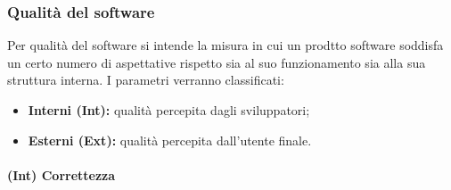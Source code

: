\begin{table}[!htpb]
\end{table}
\subsubsection{Qualità del software}
Per qualità del software si intende la misura in cui un prodtto software soddisfa un certo numero di aspettative rispetto sia al suo funzionamento sia alla sua struttura interna. I parametri verranno classificati:
\begin{itemize}
	\item{\textbf{Interni (Int):} qualità percepita dagli sviluppatori;}
	\item{\textbf{Esterni (Ext):} qualità percepita dall'utente finale.}
\end{itemize}
\paragraph{\textbf{(Int) Correttezza}}
